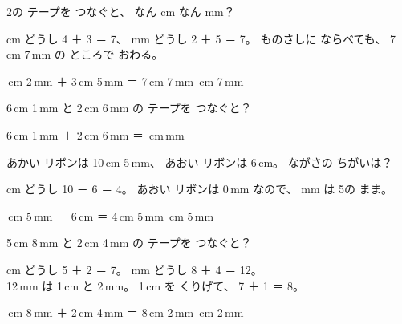 \begin{reidai}[つなぐ]
2の テープを つなぐと、 なん cm なん mm？
\par\vspace{2pt}\noindent\hfill{}\hfill\null\par\vspace{2pt}
\kangaekata cm どうし 4 ＋ 3 ＝ 7、 mm どうし 2 ＋ 5 ＝ 7。 ものさしに ならべても、 7\,cm 7\,mm の ところで おわる。
\begin{bkfigure}
\end{bkfigure}

\,cm 2\,mm ＋ 3\,cm 5\,mm ＝ 7\,cm 7\,mm \,cm 7\,mm
\end{reidai}

\begin{jibun}
6\,cm 1\,mm と 2\,cm 6\,mm の テープを つなぐと？\par
\noindent\hspace*{1\zw}6\,cm 1\,mm ＋ 2\,cm 6\,mm ＝ \bkkakikomi\,cm\enspace\bkkakikomi\,mm
\end{jibun}

\begin{reidai}[ちがい]
あかい リボンは 10\,cm 5\,mm、 あおい リボンは 6\,cm。 ながさの ちがいは？

\kangaekata cm どうし 10 － 6 ＝ 4。 あおい リボンは 0\,mm なので、 mm は 5の まま。

\,cm 5\,mm － 6\,cm ＝ 4\,cm 5\,mm \,cm 5\,mm
\end{reidai}



\begin{reidai}[mm が 10を こえる たし\R{算}{ざん}]
5\,cm 8\,mm と 2\,cm 4\,mm の テープを つなぐと？

\kangaekata cm どうし 5 ＋ 2 ＝ 7。 mm どうし 8 ＋ 4 ＝ 12。\\
12\,mm は 1\,cm と 2\,mm。 1\,cm を くりげて、 7 ＋ 1 ＝ 8。

\,cm 8\,mm ＋ 2\,cm 4\,mm ＝ 8\,cm 2\,mm \,cm 2\,mm
\end{reidai}

